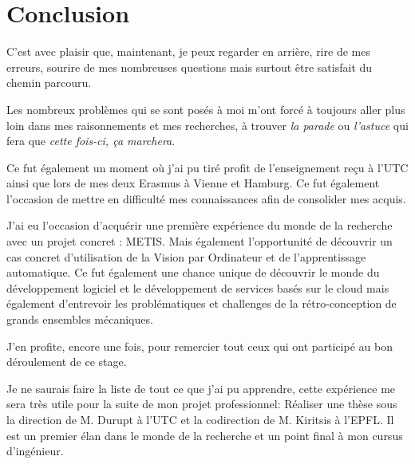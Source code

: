 \chapter{Conclusion}

C'est avec plaisir que, maintenant, je peux regarder en arrière, rire de mes erreurs, sourire de mes nombreuses questions mais surtout être satisfait du chemin parcouru.

Les nombreux problèmes qui se sont posés à moi m'ont forcé à toujours aller plus loin dans mes raisonnements et mes recherches, à trouver \textit{la parade} ou \textit{l'astuce} qui fera que \textit{cette fois-ci, ça marchera}.

Ce fut également un moment où j'ai pu tiré profit de l'enseignement reçu à l'UTC ainsi que lors de mes deux Erasmus à Vienne et Hamburg. Ce fut également l'occasion de mettre en difficulté mes connaissances afin de consolider mes acquis.

J'ai eu l'occasion d'acquérir une première expérience du monde de la recherche avec un projet concret : METIS. Mais également l'opportunité de découvrir un cas concret d'utilisation de la Vision par Ordinateur et de l'apprentissage automatique. Ce fut également une chance unique de découvrir le monde du développement logiciel et le développement de services basés sur le cloud mais également d'entrevoir les problématiques et challenges de la rétro-conception de grands ensembles mécaniques.

J'en profite, encore une fois, pour remercier tout ceux qui ont participé au bon déroulement de ce stage. 

Je ne saurais faire la liste de tout ce que j'ai pu apprendre, cette expérience me sera très utile pour la suite de mon projet professionnel: Réaliser une thèse sous la direction de M. Durupt à l'UTC et la codirection de M. Kiritsis à l'EPFL. Il est un premier élan dans le monde de la recherche et un point final à mon cursus d'ingénieur.